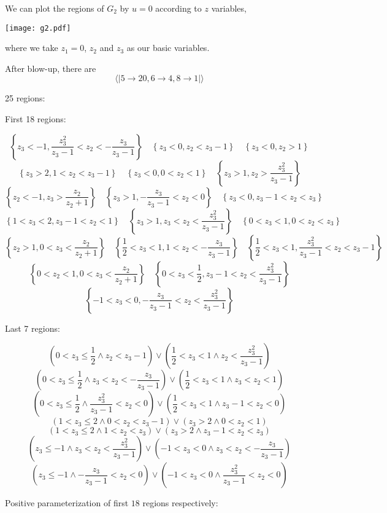 \documentclass[12pt]{article}
\theoremstyle{definition}
\theoremstyle{plain}
\begin{document}
We can plot the regions of $G_2$ by $u=0$ according to $z$ variables,
\begin{center}
    \texttt{[image: g2.pdf]}
\end{center}
where we take $z_1=0$, $z_2$ and $z_3$ as our basic variables.

After blow-up, there are 
\[
    \langle|5 \to 20, 6 \to 4, 8 \to 1|\rangle
\]


25 regions:

First 18 regions:

\[\left\{z_3<-1,\frac{z_3^2}{z_3-1}<z_2<-\frac{z_3}{z_3-1}\right\}
\quad\left\{z_3<0,z_2<z_3-1\right\}
\quad\left\{z_3<0,z_2>1\right\}\]
\[\left\{z_3>2,1<z_2<z_3-1\right\}
\quad \left\{z_3<0,0<z_2<1\right\}
\quad \left\{z_3>1,z_2>\frac{z_3^2}{z_3-1}\right\}\]
\[\left\{z_2<-1,z_3>\frac{z_2}{z_2+1}\right\}
\quad \left\{z_3>1,-\frac{z_3}{z_3-1}<z_2<0\right\}
\quad \left\{z_3<0,z_3-1<z_2<z_3\right\}\]
\[\left\{1<z_3<2,z_3-1<z_2<1\right\}
\quad \left\{z_3>1,z_3<z_2<\frac{z_3^2}{z_3-1}\right\}
\quad \left\{0<z_3<1,0<z_2<z_3\right\}\]
\[\left\{z_2>1,0<z_3<\frac{z_2}{z_2+1}\right\}
\quad \left\{\frac{1}{2}<z_3<1,1<z_2<-\frac{z_3}{z_3-1}\right\}
\quad \left\{\frac{1}{2}<z_3<1,\frac{z_3^2}{z_3-1}<z_2<z_3-1\right\}\]
\[\left\{0<z_2<1,0<z_3<\frac{z_2}{z_2+1}\right\}
\quad \left\{0<z_3<\frac{1}{2},z_3-1<z_2<\frac{z_3^2}{z_3-1}\right\}\]
\[\left\{-1<z_3<0,-\frac{z_3}{z_3-1}<z_2<\frac{z_3^2}{z_3-1}\right\}\]

Last 7 regions:

\[\left(0<z_3\leq \frac{1}{2}\land z_2<z_3-1\right)\lor \left(\frac{1}{2}<z_3<1\land z_2<\frac{z_3^2}{z_3-1}\right)\]
\[\left(0<z_3\leq \frac{1}{2}\land z_3<z_2<-\frac{z_3}{z_3-1}\right)\lor \left(\frac{1}{2}<z_3<1\land z_3<z_2<1\right)\]
\[\left(0<z_3\leq \frac{1}{2}\land \frac{z_3^2}{z_3-1}<z_2<0\right)\lor \left(\frac{1}{2}<z_3<1\land z_3-1<z_2<0\right)\]
\[\left(1<z_3\leq 2\land 0<z_2<z_3-1\right)\lor \left(z_3>2\land 0<z_2<1\right)\]
\[\left(1<z_3\leq 2\land 1<z_2<z_3\right)\lor \left(z_3>2\land z_3-1<z_2<z_3\right)\]
\[\left(z_3\leq -1\land z_3<z_2<\frac{z_3^2}{z_3-1}\right)\lor \left(-1<z_3<0\land z_3<z_2<-\frac{z_3}{z_3-1}\right)\]
\[\left(z_3\leq -1\land -\frac{z_3}{z_3-1}<z_2<0\right)\lor \left(-1<z_3<0\land \frac{z_3^2}{z_3-1}<z_2<0\right)\]

Positive parameterization of first $18$ regions respectively:
\end{document}
